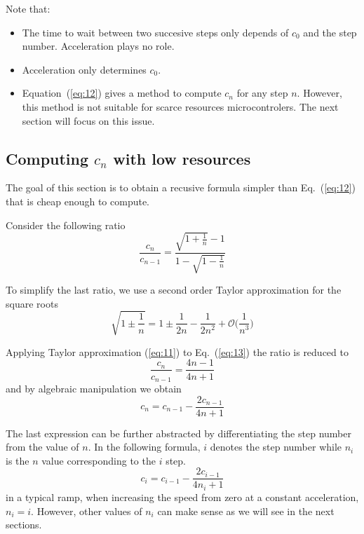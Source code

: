 \documentclass[a4paper]{article}
\begin{document}
Note that:
\begin{itemize}
\item The time to wait between two succesive steps only depends of
  $c_0$ and the step number. Acceleration plays no role.
\item Acceleration only determines $c_0$.
\item Equation~(\ref{eq:12}) gives a method to compute $c_n$ for any
  step $n$. However, this method is not suitable for scarce resources
  microcontrolers. The next section will focus on this issue.
\end{itemize}


\subsection{Computing $c_n$ with low resources}

The goal of this section is to obtain a recusive formula simpler than
Eq.~(\ref{eq:12}) that is cheap enough to compute.

Consider the following ratio
\begin{equation}
  \label{eq:13}
  \frac{c_n}{c_{n-1}} = \frac{\sqrt{1+\frac{1}{n}}-1}{1-\sqrt{1-\frac{1}{n}}}  
\end{equation}

To simplify the last ratio, we use a second order Taylor approximation
for the square roots
\begin{equation}
  \label{eq:11}
  \sqrt{1\pm\frac{1}{n}} = 1\pm\frac{1}{2n}-\frac{1}{2n^2}
                           +\mathcal{O}\bigg(\frac{1}{n^3}\bigg)  
\end{equation}

Applying Taylor approximation (\ref{eq:11}) to Eq.~(\ref{eq:13}) the
ratio is reduced to
\begin{equation}
  \label{eq:14}
  \frac{c_n}{c_{n-1}} = \frac{4n-1}{4n+1}  
\end{equation}
and by algebraic manipulation we obtain
\begin{equation*}
  c_n = c_{n-1} - \frac{2c_{n-1}}{4n+1}  
\end{equation*}

The last expression can be further abstracted by differentiating the
step number from the value of $n$. In the following formula, $i$
denotes the step number while $n_i$ is the $n$ value corresponding to
the $i$ step. 
\begin{equation}
  \label{eq:16}
  c_i = c_{i-1} - \frac{2c_{i-1}}{4n_i + 1}  
\end{equation}
in a typical ramp, when increasing the speed from zero at a constant
acceleration, $n_i=i$. However, other values of $n_i$ can
make sense as we will see in the next sections.
\end{document}
